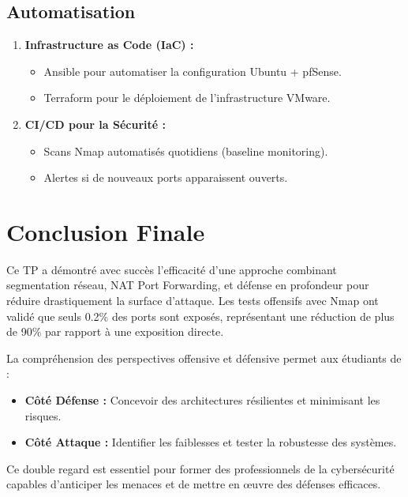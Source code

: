 \documentclass[12pt,a4paper,openany]{report}
\begin{document}
	\subsection{Automatisation}
	\begin{enumerate}
		\item \textbf{Infrastructure as Code (IaC) :}
		\begin{itemize}
			\item Ansible pour automatiser la configuration Ubuntu + pfSense.
			\item Terraform pour le déploiement de l'infrastructure VMware.
		\end{itemize}
		
		\item \textbf{CI/CD pour la Sécurité :}
		\begin{itemize}
			\item Scans Nmap automatisés quotidiens (baseline monitoring).
			\item Alertes si de nouveaux ports apparaissent ouverts.
		\end{itemize}
	\end{enumerate}
	
	\section{Conclusion Finale}
	Ce TP a démontré avec succès l'efficacité d'une approche combinant segmentation réseau, NAT Port Forwarding, et défense en profondeur pour réduire drastiquement la surface d'attaque. Les tests offensifs avec Nmap ont validé que seuls 0.2\% des ports sont exposés, représentant une réduction de plus de 90\% par rapport à une exposition directe.
	
	La compréhension des perspectives offensive et défensive permet aux étudiants de :
	\begin{itemize}
		\item \textbf{Côté Défense :} Concevoir des architectures résilientes et minimisant les risques.
		\item \textbf{Côté Attaque :} Identifier les faiblesses et tester la robustesse des systèmes.
	\end{itemize}
	
	Ce double regard est essentiel pour former des professionnels de la cybersécurité capables d'anticiper les menaces et de mettre en œuvre des défenses efficaces.
	
\end{document}
